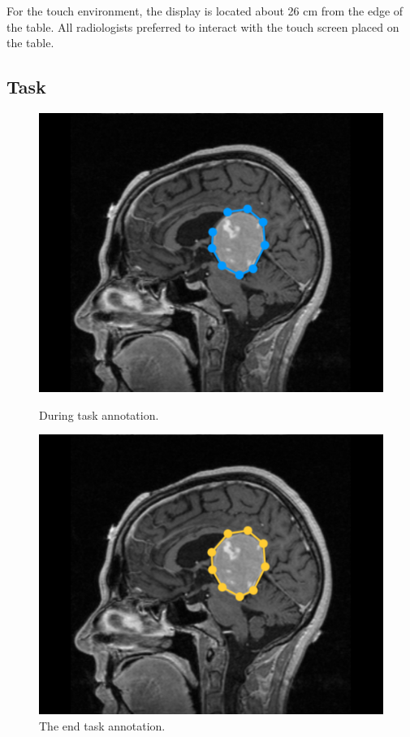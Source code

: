 \documentclass{sigchi}
\begin{document}
For the touch environment, the display is located about 26 cm from the edge of the table. All radiologists preferred to interact with the touch screen placed on the table.

\subsection{Task}

\begin{figure}[!tbp]
  \centering
  \begin{minipage}[b]{0.2\textwidth}
    \includegraphics[width=\textwidth]{screen2}
    \caption{During task annotation.}
    \label{fig:Fig4}
  \end{minipage}
  \hfill
  \begin{minipage}[b]{0.2\textwidth}
    \includegraphics[width=\textwidth]{screen3}
    \caption{The end task annotation.}
    \label{fig:Fig5}
  \end{minipage}
\end{figure}
\end{document}
